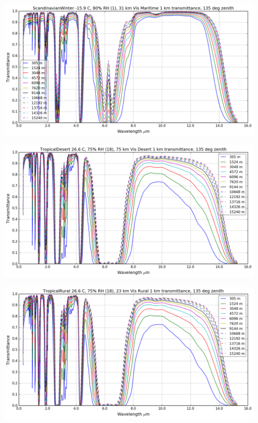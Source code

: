 \documentclass{workpackage}
\begin{document}
\begin{center}
\includegraphics{./pic/Analyse-Standard-Atmospheres_17_6.png}
\end{center}

\begin{center}
\includegraphics{./pic/Analyse-Standard-Atmospheres_17_7.png}
\end{center}

\begin{center}
\includegraphics{./pic/Analyse-Standard-Atmospheres_17_8.png}
\end{center}
\end{document}
